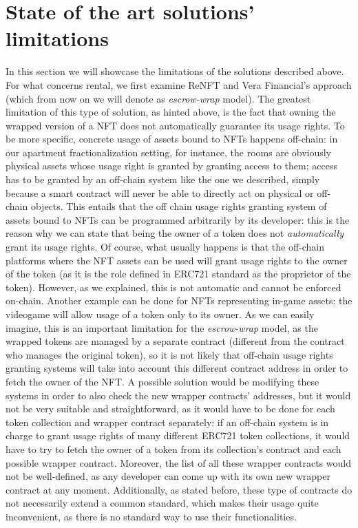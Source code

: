 \documentclass[english, LaM, oneside]{sapthesis}%
\begin{document}
\section{State of the art solutions' limitations}
In this section we will showcase the limitations of the solutions described above.\newline
For what concerns rental, we first examine ReNFT and Vera Financial's approach (which from now on we will denote as \textit{escrow-wrap} model). The greatest limitation of this type of solution, as hinted above, is the fact that owning the wrapped version of a NFT does not automatically guarantee its usage rights. To be more specific, concrete usage of assets bound to NFTs happens off-chain: in our apartment fractionalization setting, for instance, the rooms are obviously physical assets whose usage right is granted by granting access to them; access has to be granted by an off-chain system like the one we described, simply because a smart contract will never be able to directly act on physical or off-chain objects. This entails that the off chain usage rights granting system of assets bound to NFTs can be programmed arbitrarily by its developer: this is the reason why we can state that being the owner of a token does not \textit{automatically} grant its usage rights. Of course, what usually happens is that the off-chain platforms where the NFT assets can be used will grant usage rights to the owner of the token (as it is the role defined in ERC721 standard as the proprietor of the token). However, as we explained, this is not automatic and cannot be enforced on-chain.
Another example can be done for NFTs representing in-game assets: the videogame will allow usage of a token only to its owner.\newline
As we can easily imagine, this is an important limitation for the \textit{escrow-wrap} model, as the wrapped tokens are managed by a separate contract (different from the contract who manages the original token), so it is not likely that off-chain usage rights granting systems will take into account this different contract address in order to fetch the owner of the NFT. A possible solution would be modifying these systems in order to also check the new wrapper contracts' addresses, but it would not be very suitable and straightforward, as it would have to be done for each token collection and wrapper contract separately: if an off-chain system is in charge to grant usage rights of many different ERC721 token collections, it would have to try to fetch the owner of a token from its collection's contract and each possible wrapper contract. Moreover, the list of all these wrapper contracts would not be well-defined, as any developer can come up with its own new wrapper contract at any moment. Additionally, as stated before, these type of contracts do not necessarily extend a common standard, which makes their usage quite inconvenient, as there is no standard way to use their functionalities. \newline
\end{document}
